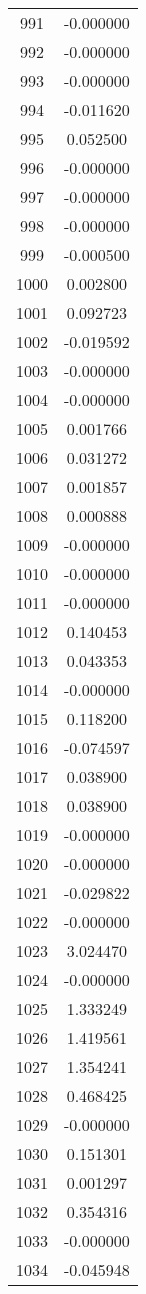 \documentclass[12pt]{article}
\begin{document}
\begin{longtable}{@{}cc@{}}
991 & -0.000000 \\
992 & -0.000000 \\
993 & -0.000000 \\
994 & -0.011620 \\
995 & 0.052500 \\
996 & -0.000000 \\
997 & -0.000000 \\
998 & -0.000000 \\
999 & -0.000500 \\
1000 & 0.002800 \\
1001 & 0.092723 \\
1002 & -0.019592 \\
1003 & -0.000000 \\
1004 & -0.000000 \\
1005 & 0.001766 \\
1006 & 0.031272 \\
1007 & 0.001857 \\
1008 & 0.000888 \\
1009 & -0.000000 \\
1010 & -0.000000 \\
1011 & -0.000000 \\
1012 & 0.140453 \\
1013 & 0.043353 \\
1014 & -0.000000 \\
1015 & 0.118200 \\
1016 & -0.074597 \\
1017 & 0.038900 \\
1018 & 0.038900 \\
1019 & -0.000000 \\
1020 & -0.000000 \\
1021 & -0.029822 \\
1022 & -0.000000 \\
1023 & 3.024470 \\
1024 & -0.000000 \\
1025 & 1.333249 \\
1026 & 1.419561 \\
1027 & 1.354241 \\
1028 & 0.468425 \\
1029 & -0.000000 \\
1030 & 0.151301 \\
1031 & 0.001297 \\
1032 & 0.354316 \\
1033 & -0.000000 \\
1034 & -0.045948 \\

\end{longtable}
\end{document}
